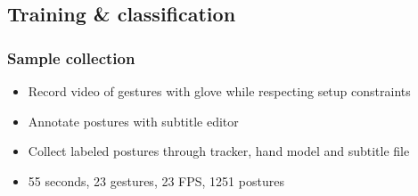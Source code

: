 \documentclass{beamer}
\begin{document}
	\subsection{Training \& classification}
	\begin{frame}
		\frametitle{Sample collection}
		\begin{itemize}
			\item Record video of gestures with glove while respecting setup constraints
			\item Annotate postures with subtitle editor
			\item Collect labeled postures through tracker, hand model and subtitle file
			\item 55 seconds, 23 gestures, 23 FPS, 1251 postures
		\end{itemize}
	\end{frame}
\end{document}
